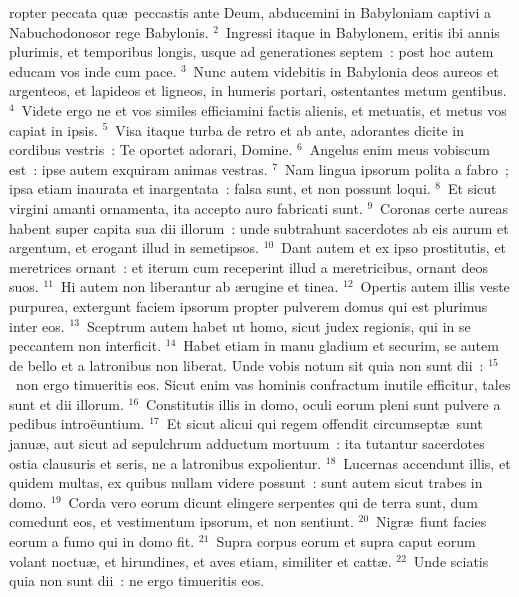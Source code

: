 \bchapter
{}ropter peccata qu\ae\ peccastis ante Deum, abducemini in Babyloniam captivi a Nabuchodonosor rege Babylonis.
${}^{2}$~Ingressi itaque in Babylonem, eritis ibi annis plurimis, et temporibus longis, usque ad generationes septem~: post hoc autem educam vos inde cum pace.
${}^{3}$~Nunc autem videbitis in Babylonia deos aureos et argenteos, et lapideos et ligneos, in humeris portari, ostentantes metum gentibus.
${}^{4}$~Videte ergo ne et vos similes efficiamini factis alienis, et metuatis, et metus vos capiat in ipsis.
${}^{5}$~Visa itaque turba de retro et ab ante, adorantes dicite in cordibus vestris~: Te oportet adorari, Domine.
${}^{6}$~Angelus enim meus vobiscum est~: ipse autem exquiram animas vestras.
${}^{7}$~Nam lingua ipsorum polita a fabro~; ipsa etiam inaurata et inargentata~: falsa sunt, et non possunt loqui.
${}^{8}$~Et sicut virgini amanti ornamenta, ita accepto auro fabricati sunt.
${}^{9}$~Coronas certe aureas habent super capita sua dii illorum~: unde subtrahunt sacerdotes ab eis aurum et argentum, et erogant illud in semetipsos.
${}^{10}$~Dant autem et ex ipso prostitutis, et meretrices ornant~: et iterum cum receperint illud a meretricibus, ornant deos suos.
${}^{11}$~Hi autem non liberantur ab \ae rugine et tinea.
${}^{12}$~Opertis autem illis veste purpurea, extergunt faciem ipsorum propter pulverem domus qui est plurimus inter eos.
${}^{13}$~Sceptrum autem habet ut homo, sicut judex regionis, qui in se peccantem non interficit.
${}^{14}$~Habet etiam in manu gladium et securim, se autem de bello et a latronibus non liberat. Unde vobis notum sit quia non sunt dii~:
${}^{15}$~non ergo timueritis eos. Sicut enim vas hominis confractum inutile efficitur, tales sunt et dii illorum.
${}^{16}$~Constitutis illis in domo, oculi eorum pleni sunt pulvere a pedibus intro\"euntium.
${}^{17}$~Et sicut alicui qui regem offendit circumsept\ae\ sunt janu\ae , aut sicut ad sepulchrum adductum mortuum~: ita tutantur sacerdotes ostia clausuris et seris, ne a latronibus expolientur.
${}^{18}$~Lucernas accendunt illis, et quidem multas, ex quibus nullam videre possunt~: sunt autem sicut trabes in domo.
${}^{19}$~Corda vero eorum dicunt elingere serpentes qui de terra sunt, dum comedunt eos, et vestimentum ipsorum, et non sentiunt.
${}^{20}$~Nigr\ae\ fiunt facies eorum a fumo qui in domo fit.
${}^{21}$~Supra corpus eorum et supra caput eorum volant noctu\ae , et hirundines, et aves etiam, similiter et catt\ae .
${}^{22}$~Unde sciatis quia non sunt dii~: ne ergo timueritis eos.


